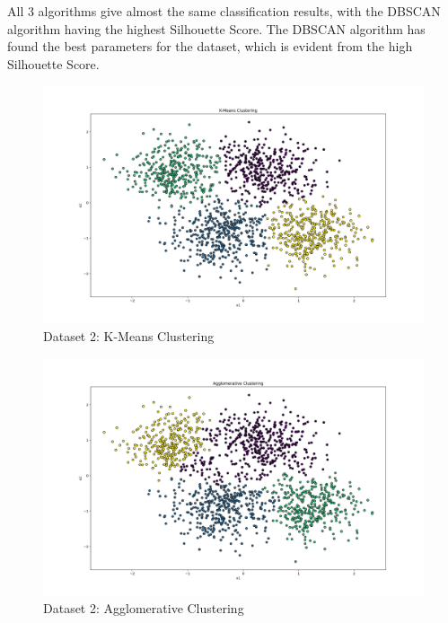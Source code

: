 All 3 algorithms give almost the same classification results, with the DBSCAN algorithm having the highest Silhouette Score. The DBSCAN algorithm has found the best parameters for the dataset, which is evident from the high Silhouette Score.

\clearpage

\begin{figure}[H]
	\centering
	\includegraphics[width=0.9\linewidth]{Images/Clusters-5-v1-K-Means Clustering.png}
	\caption{Dataset 2: K-Means Clustering}
	\label{fig:clusters-5-v1-k-means-clustering}
\end{figure}

\begin{figure}[H]
	\centering
	\includegraphics[width=0.9\linewidth]{Images/Clusters-5-v1-Agglomerative Clustering.png}
	\caption{Dataset 2: Agglomerative Clustering}
	\label{fig:clusters-5-v1-agglomerative-clustering}
\end{figure}

